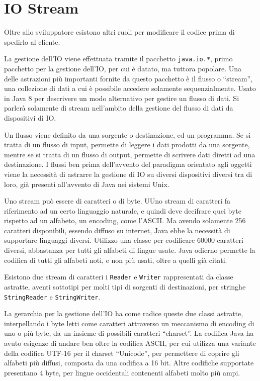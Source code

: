 \documentclass{article}
\numberwithin{equation}{subsection}
\begin{document}

\clearpage

\section{IO Stream}

Oltre allo sviluppatore esistono altri ruoli per modificare il codice prima di spedirlo al cliente. 

La gestione dell'IO viene effettuata tramite il pacchetto \verb|java.io.*|, primo pacchetto per la gestione dell'IO, per cui è datato, ma tuttora popolare. 
Una delle astrazioni più importanti fornite da questo pacchetto è il flusso o ``stream'', una collezione di dati a cui è possibile accedere solamente sequenzialmente. 
Usato in Java 8 per descrivere un modo alternativo per gestire un flusso di dati. 
Si parlerà solamente di stream nell'ambito della gestione del flusso di dati da dispositivi di IO. 

Un flusso viene definito da una sorgente o destinazione, ed un programma. Se si tratta di un flusso di input, permette di leggere i dati prodotti da una sorgente, mentre se si tratta di un 
flusso di output, permette di scrivere dati diretti ad una destinazione. 
I flussi ben prima dell'avvento del paradigma orientato agli oggetti viene la necessità di astrarre la gestione di IO su diversi dispositivi diversi tra di loro, già presenti 
all'avvento di Java nei sistemi Unix. 

Uno stream può essere di caratteri o di byte. UUno stream di caratteri fa riferimento ad un certo linguaggio naturale, e quindi deve decifrare quei byte rispetto ad un alfabeto, 
un encoding, come l'ASCII. Ma avendo solamente 256 caratteri disponibili, essendo diffuso su internet, Java ebbe la necessità di supportare linguaggi diversi. Utilizzo una classe 
per codificare 60000 caratteri diversi, abbastanza per tutti gli alfabeti di lingue usate. Java odierno permette la codifica di tutti gli alfabeti noti, e non più usati, oltre 
a quelli già citati. 

Esistono due stream di caratteri i \verb|Reader| e \verb|Writer| rappresentati da classe astratte, aventi sottotipi per molti tipi di sorgenti di destinazioni, per stringhe 
\verb|StringReader| e \verb|StringWriter|. 

La gerarchia per la gestione dell'IO ha come radice queste due classi astratte, interpellando i byte letti come caratteri attraverso un meccanismo di encoding di uno o più byte, 
da un insieme di possibili caratteri ``charset''. 
La codifica Java ha avuto esigenze di andare ben oltre la codifica ASCII, per cui utilizza una variante della codifica UTF-16 per il charset ``Unicode'', per permettere di 
coprire gli alfabeti più diffusi, composta da una codifica a 16 bit. 
Altre codifiche supportate presentano 4 byte, per lingue occidentali contenenti alfabeti molto più ampi. 
\end{document}
